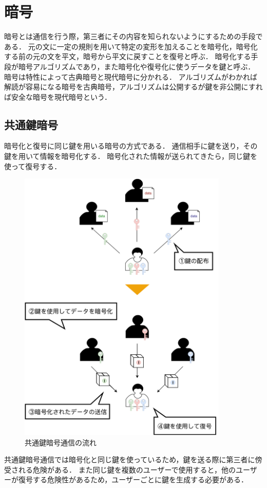 \documentclass[a4j,12pt]{jsarticle}
\begin{document}
\newpage
\section{暗号}
暗号とは通信を行う際，第三者にその内容を知られないようにするための手段である．
元の文に一定の規則を用いて特定の変形を加えることを暗号化，暗号化する前の元の文を平文，暗号から平文に戻すことを復号と呼ぶ．
暗号化する手段が暗号アルゴリズムであり，また暗号化や復号化に使うデータを鍵と呼ぶ．
暗号は特性によって古典暗号と現代暗号に分かれる．
アルゴリズムがわかれば解読が容易になる暗号を古典暗号，アルゴリズムは公開するが鍵を非公開にすれば安全な暗号を現代暗号という．

\newpage
\subsection{共通鍵暗号}
暗号化と復号に同じ鍵を用いる暗号の方式である．
通信相手に鍵を送り，その鍵を用いて情報を暗号化する．
暗号化された情報が送られてきたら，同じ鍵を使って復号する．


\begin{figure}[H]
\centering
\includegraphics[width=10cm]{kyotu.pdf}
\caption{共通鍵暗号通信の流れ}
\label{fig:no}
\end{figure} 

共通鍵暗号通信では暗号化と同じ鍵を使っているため，鍵を送る際に第三者に傍受される危険がある．
また同じ鍵を複数のユーザーで使用すると，他のユーザーが復号する危険性があるため，ユーザーごとに鍵を生成する必要がある．
\end{document}
